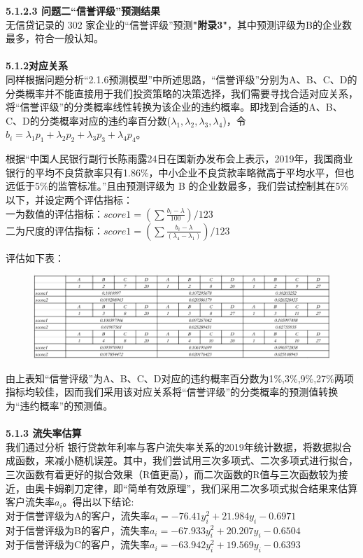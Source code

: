 \documentclass[bwprint]{cumcm}
\begin{document}
\noindent \textbf{ 5.1.2.3 问题二“信誉评级”预测结果}\\
\indent 无信贷记录的 302 家企业的“信誉评级”预测\textbf{"附录3"}，其中预测评级为B的企业数最多，符合一般认知。\\
\\
\noindent \textbf{ 5.1.2对应关系}\\
\indent  同样根据问题分析“2.1.6预测模型”中所述思路，“信誉评级”分别为A、B、C、D的分类概率并不能直接用于我们投资策略的决策选择，我们需要寻找合适对应关系，将“信誉评级”的分类概率线性转换为该企业的违约概率。即找到合适的A、B、C、D的分类概率对应的违约率百分数($\lambda_1,\lambda_2,\lambda_3,\lambda_4$)，令$b_i = \lambda_1 p_1 +  \lambda_2 p_2 + \lambda_3 p_3 + \lambda_4p_4$。

\indent  根据“中国人民银行副行长陈雨露24日在国新办发布会上表示，2019年，我国商业银行的平均不良贷款率只有1.86\%，中小企业不良贷款率略微高于平均水平，但也远低于5\%的监管标准。”且由预测评级为 B 的企业数最多，我们尝试控制其在5\%以下，并设定两个评估指标：\\
一为数值的评估指标：$score1 = (\sum \frac{b_i-\lambda}{100})/   123$\\
二为尺度的评估指标：$score1 = (\sum \frac{b_i-\lambda}{ (\lambda_4-\lambda_1)})/   123$

评估如下表：

 \begin{figure}[h]%
	\centering  %
	\includegraphics[width=0.8\linewidth]{figures/figure10.jpg}  %
	\label{fig:mcmthesis-logo}   %
\end{figure}
由上表知“信誉评级”为A、B、C、D对应的违约概率百分数为1\%,3\%,9\%,27\%两项指标均较佳，因而我们采用该对应关系将“信誉评级”的分类概率的预测值转换为“违约概率”的预测值。\\
\\
\noindent \textbf{ 5.1.3 流失率估算}\\
\indent 我们通过分析 银行贷款年利率与客户流失率关系的2019年统计数据，将数据拟合成函数，来减小随机误差。其中，我们尝试用三次多项式、二次多项式进行拟合，三次函数有着更好的拟合效果（R值更高），而二次函数的R值与三次函数较为接近，由奥卡姆剃刀定律，即“简单有效原理”，我们采用二次多项式拟合结果来估算客户流失率$a_i$。得出以下结论:\\
对于信誉评级为A的客户，流失率$a_i=-76.41y_i^2+21.984y_i-0.6971$\\
对于信誉评级为B的客户，流失率$a_i=-67.933y_i^2+20.207y_i-0.6504$\\
对于信誉评级为C的客户，流失率$a_i=-63.942y_i^2+19.569y_i-0.6393$\\
\end{document}
